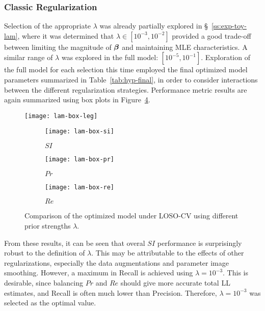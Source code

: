 \subsubsection{Classic Regularization}\label{sss:exp-lam}
Selection of the appropriate $\lambda$ was already partially explored in \S~\ref{ss:exp-toy-lam},
where it was determined that $\lambda \in [{10}^{-3},{10}^{-2}]$ provided a good trade-off 
between limiting the magnitude of $\bm{\beta}$ and maintaining MLE characteristics.
A similar range of $\lambda$ was explored in the full model: $[{10}^{-5},{10}^{-1}]$.
Exploration of the full model for each selection this time
employed the final optimized model parameters summarized in Table~\ref{tab:hyp-final},
in order to consider interactions between the different regularization strategies.
Performance metric results are again summarized using box plots in Figure~\ref{fig:seg-box-lam}.
\par
\begin{figure}
  \centering
  \texttt{[image: lam-box-leg]}\\[0.5em]
  \begin{subfigure}{0.32\textwidth}
    \centering\texttt{[image: lam-box-si]}
    \caption{$SI$}%
    \label{fig:seg-box-lam-si}
  \end{subfigure}
  \begin{subfigure}{0.32\textwidth}
    \centering\texttt{[image: lam-box-pr]}
    \caption{$Pr$}%
    \label{fig:seg-box-lam-pr}
  \end{subfigure}
  \begin{subfigure}{0.32\textwidth}
    \centering\texttt{[image: lam-box-re]}
    \caption{$Re$}%
    \label{fig:seg-box-lam-re}
  \end{subfigure}
  \caption{Comparison of the optimized model under LOSO-CV
    using different prior strengths $\lambda$.}%
  \label{fig:seg-box-lam}
\end{figure}
From these results, it can be seen that overal $SI$ performance
is surprisingly robust to the definition of $\lambda$.
This may be attributable to the effects of other regularizations,
especially the data augmentations and parameter image smoothing.
However, a maximum in Recall is achieved using $\lambda = 10^{-3}$.
This is desirable, since balancing $Pr$ and $Re$ should give %
more accurate total LL estimates, and Recall is often much lower than Precision.
Therefore, $\lambda = 10^{-3}$ was selected as the optimal value.
